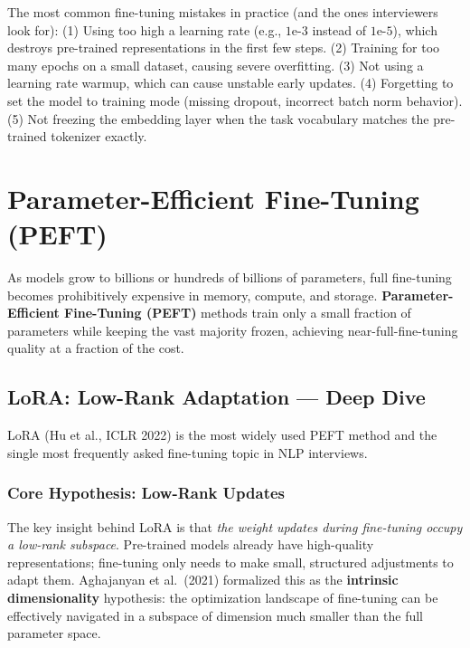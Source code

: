\begin{warningbox}
The most common fine-tuning mistakes in practice (and the ones interviewers
look for): (1) Using too high a learning rate (e.g., $1\text{e-}3$ instead of
$1\text{e-}5$), which destroys pre-trained representations in the first few
steps. (2) Training for too many epochs on a small dataset, causing severe
overfitting. (3) Not using a learning rate warmup, which can cause unstable
early updates. (4) Forgetting to set the model to training mode (missing
dropout, incorrect batch norm behavior). (5) Not freezing the embedding layer
when the task vocabulary matches the pre-trained tokenizer exactly.
\end{warningbox}


\section{Parameter-Efficient Fine-Tuning (PEFT)}
\label{sec:peft}

As models grow to billions or hundreds of billions of parameters, full
fine-tuning becomes prohibitively expensive in memory, compute, and storage.
\textbf{Parameter-Efficient Fine-Tuning (PEFT)} methods train only a small
fraction of parameters while keeping the vast majority frozen, achieving
near-full-fine-tuning quality at a fraction of the cost.

\subsection{LoRA: Low-Rank Adaptation --- Deep Dive}
\label{sec:lora}

LoRA (Hu et al., ICLR 2022) is the most widely used PEFT method and the
single most frequently asked fine-tuning topic in NLP interviews.

\subsubsection{Core Hypothesis: Low-Rank Updates}

The key insight behind LoRA is that \emph{the weight updates during fine-tuning
occupy a low-rank subspace}.  Pre-trained models already have high-quality
representations; fine-tuning only needs to make small, structured adjustments
to adapt them.  Aghajanyan et al.\ (2021) formalized this as the
\textbf{intrinsic dimensionality} hypothesis: the optimization landscape of
fine-tuning can be effectively navigated in a subspace of dimension much
smaller than the full parameter space.

